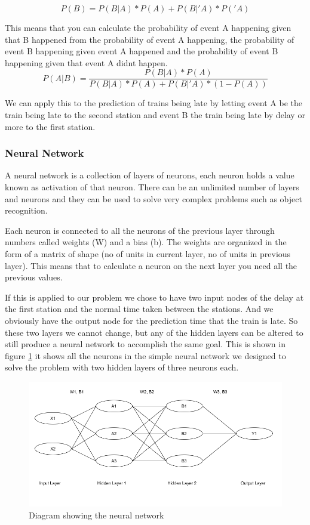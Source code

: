 \documentclass[11pt]{article}
\begin{document}
	\[P(B) = P(B|A) * P(A) + P(B|'A) * P('A)\]
	
	This means that you can calculate the probability of event A happening given that B happened from the probability of event A happening, the probability of  event B happening given event A happened and the probability of event B happening given that event A didnt happen.
	\[P(A|B) = \frac{P(B|A) * P(A)}{P(B|A) * P(A) + P(B|'A) * (1 - P(A))} \]	
	
	We can apply this to the prediction of trains being late by letting event A be the train being late to the second station and event B the train being late by delay or more to the first station.
	
	\subsubsection{Neural Network}
	
	A neural network is a collection of layers of neurons, each neuron holds a value known as activation of that neuron. There can be an unlimited number of layers and neurons and they can be used to solve very complex problems such as object recognition.
	
	Each neuron is connected to all the neurons of the previous layer through numbers called weights (W) and a bias (b). The weights are organized in the form of a matrix of shape (no of units in current layer, no of units in previous layer). This means that to calculate a neuron on the next layer you need all the previous values.
	
	If this is applied to our problem we chose to have two input nodes of the delay at the first station and the normal time taken between the stations. And we obviously have the output node for the prediction time that the train is late. So these two layers we cannot change, but any of the hidden layers can be altered to still produce a neural network to accomplish the same goal. This is shown in figure \ref{Img:NNDiagram} it shows all the neurons in the simple neural network we designed to solve the problem with two hidden layers of three neurons each.
	
	\begin{figure}[!htb]
		\begin{center}
			\includegraphics[width=1\textwidth]{Resources/PartTwo/NNDiagram.png}
			\caption{Diagram showing the neural network}
			\label{Img:NNDiagram}
		\end{center}
	\end{figure}
	
\end{document}
